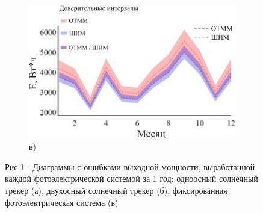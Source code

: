\begin{figure}[H]
    \begin{subfigure}[b]{0.45\textwidth}
        \centering
        \includegraphics[width=\textwidth]{media/ict/image3}
        \caption*{в)}
    \end{subfigure}
    \caption*{Рис.1 - Диаграммы с ошибками выходной мощности, выработанной каждой фотоэлектрической системой за 1 год: одноосный солнечный трекер (а), двухосный солнечный трекер (б), фиксированная фотоэлектрическая система (в)}
\end{figure}

